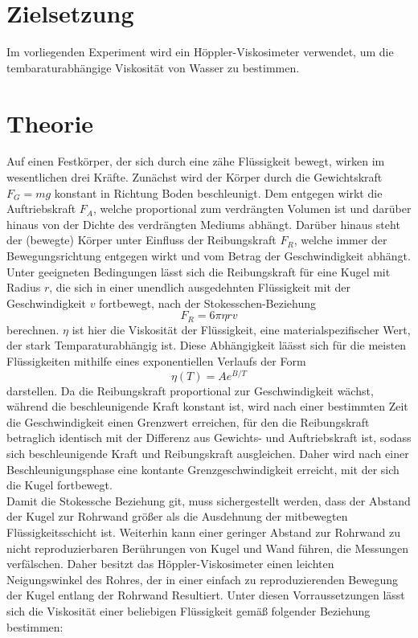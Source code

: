 \section{Zielsetzung}
\label{sec:zielsetzung}
Im vorliegenden Experiment wird ein Höppler-Viskosimeter verwendet, um die  tembaraturabhängige Viskosität von Wasser zu bestimmen.
\section{Theorie}
\label{sec:theorie}
Auf einen Festkörper, der sich durch eine zähe Flüssigkeit bewegt, wirken im wesentlichen drei Kräfte. Zunächst wird der Körper durch die Gewichtskraft $F_G=mg$ konstant in Richtung Boden beschleunigt. Dem entgegen wirkt die Auftriebskraft $F_A$, welche proportional zum verdrängten Volumen ist und darüber hinaus von der Dichte des verdrängten Mediums abhängt. Darüber hinaus steht der (bewegte) Körper unter Einfluss der Reibungskraft $F_R$, welche immer der Bewegungsrichtung entgegen wirkt und vom Betrag der Geschwindigkeit abhängt. Unter geeigneten Bedingungen lässt sich die Reibungskraft für eine Kugel mit Radius $r$, die sich in einer unendlich ausgedehnten Flüssigkeit mit der Geschwindigkeit $v$ fortbewegt, nach der Stokesschen-Beziehung
\begin{equation}
F_R=6\pi \eta rv
\end{equation}
berechnen. $\eta$ ist hier die Viskosität der Flüssigkeit, eine materialspezifischer Wert, der stark Temparaturabhängig ist. Diese Abhängigkeit läässt sich für die meisten Flüssigkeiten mithilfe eines exponentiellen Verlaufs der Form
\begin{equation}
    \label{eq:theoriekurve}
\eta (T) = Ae^{B/T}
\end{equation}
darstellen. Da die Reibungskraft proportional zur Geschwindigkeit wächst, während die beschleunigende Kraft konstant ist, wird nach einer bestimmten Zeit die Geschwindigkeit einen Grenzwert erreichen, für den die Reibungskraft betraglich identisch mit der Differenz aus Gewichts- und Auftriebskraft ist, sodass sich beschleunigende Kraft und Reibungskraft ausgleichen. Daher wird nach einer Beschleunigungsphase eine kontante Grenzgeschwindigkeit erreicht, mit der sich die Kugel fortbewegt. \\
Damit die Stokessche Beziehung git, muss sichergestellt werden, dass der Abstand der Kugel zur Rohrwand größer als die Ausdehnung der mitbewegten Flüssigkeitsschicht ist. Weiterhin kann einer geringer Abstand zur Rohrwand zu nicht reproduzierbaren Berührungen von Kugel und Wand führen, die Messungen verfälschen. Daher besitzt das Höppler-Viskosimeter einen leichten Neigungswinkel des Rohres, der in einer einfach zu reproduzierenden Bewegung der Kugel entlang der Rohrwand Resultiert. Unter diesen Vorraussetzungen lässt sich die Viskosität einer beliebigen Flüssigkeit gemäß folgender Beziehung bestimmen:
